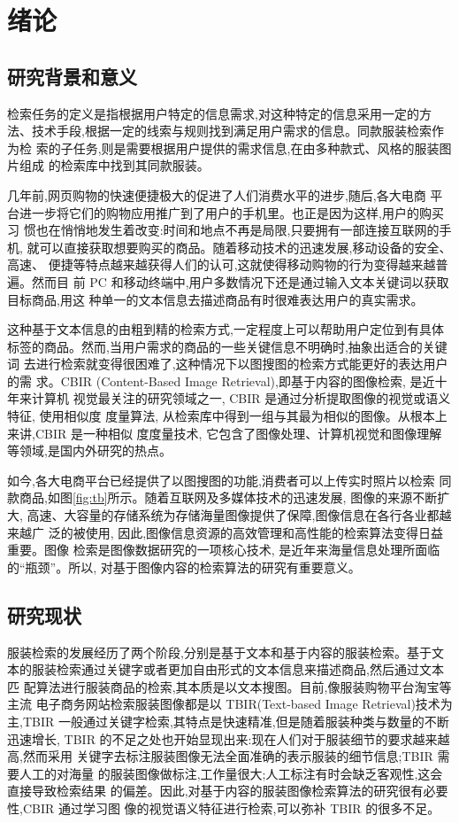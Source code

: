 \chapter{绪论}

\section{研究背景和意义}
检索任务的定义是指根据用户特定的信息需求,对这种特定的信息采用一定的方
法、技术手段,根据一定的线索与规则找到满足用户需求的信息。同款服装检索作为检
索的子任务,则是需要根据用户提供的需求信息,在由多种款式、风格的服装图片组成
的检索库中找到其同款服装。

几年前,网页购物的快速便捷极大的促进了人们消费水平的进步,随后,各大电商
平台进一步将它们的购物应用推广到了用户的手机里。也正是因为这样,用户的购买习
惯也在悄悄地发生着改变:时间和地点不再是局限,只要拥有一部连接互联网的手机,
就可以直接获取想要购买的商品。随着移动技术的迅速发展,移动设备的安全、高速、
便捷等特点越来越获得人们的认可,这就使得移动购物的行为变得越来越普遍。然而目
前 PC 和移动终端中,用户多数情况下还是通过输入文本关键词以获取目标商品,用这
种单一的文本信息去描述商品有时很难表达用户的真实需求。

这种基于文本信息的由粗到精的检索方式,一定程度上可以帮助用户定位到有具体
标签的商品。然而,当用户需求的商品的一些关键信息不明确时,抽象出适合的关键词
去进行检索就变得很困难了,这种情况下以图搜图的检索方式能更好的表达用户的需
求。CBIR (Content-Based Image Retrieval)\cite{kato1992sketch},即基于内容的图像检索, 是近十年来计算机
视觉最关注的研究领域之一, CBIR 是通过分析提取图像的视觉或语义特征, 使用相似度
度量算法, 从检索库中得到一组与其最为相似的图像。从根本上来讲,CBIR 是一种相似
度度量技术, 它包含了图像处理、计算机视觉和图像理解等领域,是国内外研究的热点。

如今,各大电商平台已经提供了以图搜图的功能,消费者可以上传实时照片以检索
同款商品,如图\ref{fig:tb}所示。随着互联网及多媒体技术的迅速发展, 图像的来源不断扩大,
高速、大容量的存储系统为存储海量图像提供了保障,图像信息在各行各业都越来越广
泛的被使用, 因此,图像信息资源的高效管理和高性能的检索算法变得日益重要。图像
检索是图像数据研究的一项核心技术, 是近年来海量信息处理所面临的“瓶颈”。所以,
对基于图像内容的检索算法的研究有重要意义。


\section{研究现状}

服装检索的发展经历了两个阶段,分别是基于文本和基于内容的服装检索。基于文
本的服装检索通过关键字或者更加自由形式的文本信息来描述商品,然后通过文本匹
配算法进行服装商品的检索,其本质是以文本搜图。目前,像服装购物平台淘宝等主流
电子商务网站检索服装图像都是以 TBIR(Text-based Image Retrieval)技术为主,TBIR
一般通过关键字检索,其特点是快速精准,但是随着服装种类与数量的不断迅速增长,
TBIR 的不足之处也开始显现出来:现在人们对于服装细节的要求越来越高,然而采用
关键字去标注服装图像无法全面准确的表示服装的细节信息;TBIR 需要人工的对海量
的服装图像做标注,工作量很大;人工标注有时会缺乏客观性,这会直接导致检索结果
的偏差。因此,对基于内容的服装图像检索算法的研究很有必要性,CBIR 通过学习图
像的视觉语义特征进行检索,可以弥补 TBIR 的很多不足。

